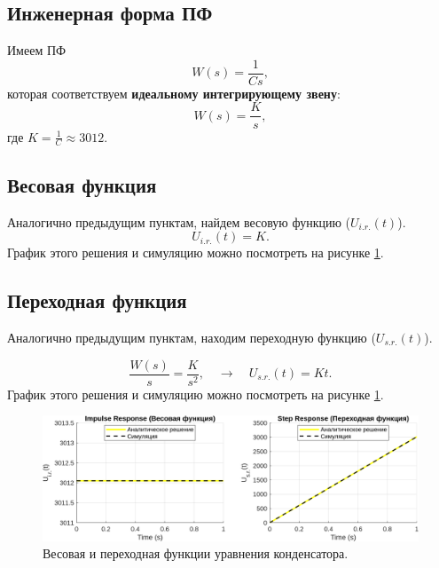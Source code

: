 \subsection{Инженерная форма ПФ}

Имеем ПФ
\begin{equation*}
    W(s)=\frac{1}{Cs},
\end{equation*}
которая соответствуем \textbf{идеальному интегрирующему звену}:
\begin{equation*}
    W(s)=\frac{K}{s},
\end{equation*}
где $K=\frac{1}{C}\approx3012$.

\subsection{Весовая функция}

Аналогично предыдущим пунктам, найдем весовую функцию ($U_{i.r.}(t)$).
\begin{equation*}
    U_{i.r.}(t)=K.
\end{equation*}
График этого решения и симуляцию можно посмотреть на рисунке \ref{fig:task_3_impl_step}.

\subsection{Переходная функция}

Аналогично предыдущим пунктам, находим переходную функцию ($U_{s.r.}(t)$).

\begin{equation*}
        \frac{W(s)}{s}=\frac{K}{s^2},\quad\rightarrow\quad
        U_{s.r.}(t)=Kt.
\end{equation*}
График этого решения и симуляцию можно посмотреть на рисунке \ref{fig:task_3_impl_step}.

\begin{figure}[htbp]
    \centering
    \includegraphics[width=1\textwidth]{figs/task_3_impl_step.png}
    \caption{Весовая и переходная функции уравнения конденсатора.}
    \label{fig:task_3_impl_step}
\end{figure}

